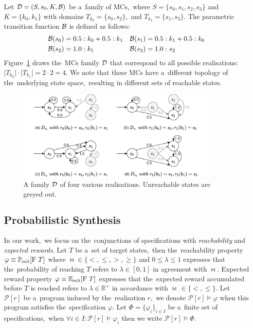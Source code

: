\begin{example}
Let $\mathcal{D} = (S,s_{0},K,\mathcal{B})$ be a~family of MCs,~where $S = \{s_0, s_1, s_2, s_3\}$ and $K = \{ k_0, k_1\}$ with domains $T_{k_0} = \{s_0, s_2\}$,~and $T_{k_1} = \{s_1, s_3\}$.
The parametric transition function $\mathcal{B}$ is defined as follows:
\begin{align*}
    \mathcal{B}(s_0) &= 0.5 : k_0 + 0.5 : k_1  &  \mathcal{B}(s_1)  &= 0.5 : k_1  + 0.5 : k_0 \\
    \mathcal{B}(s_2) &= 1.0: k_1   &  \mathcal{B}(s_3)  &= 1.0 : s_2
\end{align*}
Figure~\ref{fig:mcfamily} draws the~MCs family $\mathcal{D}$ that correspond to all possible realisations: $\lvert T_{k_0} \rvert \cdot \lvert T_{k_1} \rvert = 2 \cdot 2 = 4$.
We note that these MCs have a~different topology of the~underlying state space,~resulting in different sets of reachable states.
\end{example}

\begin{figure}[ht!]
\centering
\includegraphics[width=0.9\textwidth]{figures/MCFamily.pdf}
\caption{A family $\mathcal{D}$ of four various realisations. Unreachable states are greyed out.}%
\label{fig:mcfamily}%
\end{figure}

\subsection{Probabilistic Synthesis}

\begin{definition}[Specification]
In our work,~we focus on the~conjunctions of specifications with \textit{reachability} and \textit{expected rewards}.
Let $T$ be a~set of target states,~then the~reachability property $\varphi \equiv \mathbb{P}_{\bowtie \lambda}[\mathrm{F}\ T]$ where $\bowtie \in \{<, \leq, >, \geq\}$ and $0 \leq \lambda \leq 1$ expresses that the~probability of reaching $T$ refers to $\lambda \in [0,1]$ in agreement with $\bowtie$.
Expected reward property $\varphi \equiv \mathbb{E}_{\bowtie \lambda}[\mathrm{F}\ T]$ expresses that the~expected reward accumulated before $T$ is reached refers to $\lambda \in \mathbb{R}^+$ in accordance with $\bowtie \, \in \{<, \leq \}$.
Let $\mathcal{P}[r]$ be a~program induced by the~realisation $r$,~we denote $\mathcal{P}[r] \models \varphi$ when this program satisfies the~specification $\varphi$.
Let $\Phi = \{ \varphi_i \}_{i \in I}$ be a~finite set of specifications,~when $\forall i \in I: \mathcal{P}[r] \models \varphi_i$ then we write $\mathcal{P}[r] \models \Phi$.
\end{definition}

